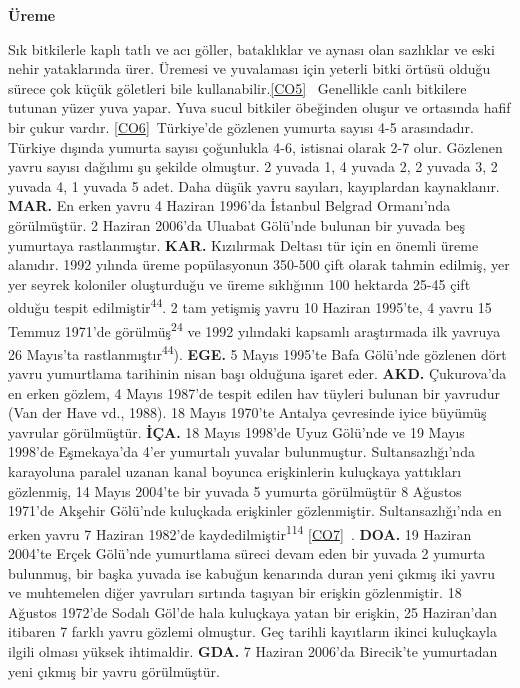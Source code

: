 \documentclass[
  letterpaper,
  DIV=11,
  numbers=noendperiod]{scrreprt}
\begin{document}
\textbf{Üreme}

Sık bitkilerle kaplı tatlı ve acı göller, bataklıklar ve aynası olan
sazlıklar ve eski nehir yataklarında ürer. Üremesi ve yuvalaması için
yeterli bitki örtüsü olduğu sürece çok küçük göletleri bile
kullanabilir.\hyperref[_msocom_5]{{[}CO5{]}}~ Genellikle canlı bitkilere
tutunan yüzer yuva yapar. Yuva sucul bitkiler öbeğinden oluşur ve
ortasında hafif bir çukur vardır.
\hyperref[_msocom_6]{{[}CO6{]}}~Türkiye'de gözlenen yumurta sayısı 4-5
arasındadır. Türkiye dışında yumurta sayısı çoğunlukla 4-6, istisnai
olarak 2-7 olur. Gözlenen yavru sayısı dağılımı şu şekilde olmuştur. 2
yuvada 1, 4 yuvada 2, 2 yuvada 3, 2 yuvada 4, 1 yuvada 5 adet. Daha
düşük yavru sayıları, kayıplardan kaynaklanır. \textbf{MAR.} En erken
yavru 4 Haziran 1996'da İstanbul Belgrad Ormanı'nda görülmüştür. 2
Haziran 2006'da Uluabat Gölü'nde bulunan bir yuvada beş yumurtaya
rastlanmıştır. \textbf{KAR.} Kızılırmak Deltası tür için en önemli üreme
alanıdır. 1992 yılında üreme popülasyonun 350-500 çift olarak tahmin
edilmiş, yer yer seyrek koloniler oluşturduğu ve üreme sıklığının 100
hektarda 25-45 çift olduğu tespit edilmiştir\textsuperscript{44}. 2 tam
yetişmiş yavru 10 Haziran 1995'te, 4 yavru 15 Temmuz 1971'de
görülmüş\textsuperscript{24} ve 1992 yılındaki kapsamlı araştırmada ilk
yavruya 26 Mayıs'ta rastlanmıştır\textsuperscript{44}). \textbf{EGE.} 5
Mayıs 1995'te Bafa Gölü'nde gözlenen dört yavru yumurtlama tarihinin
nisan başı olduğuna işaret eder. \textbf{AKD.} Çukurova'da en erken
gözlem, 4 Mayıs 1987'de tespit edilen hav tüyleri bulunan bir yavrudur
(Van der Have vd., 1988). 18 Mayıs 1970'te Antalya çevresinde iyice
büyümüş yavrular görülmüştür. \textbf{İÇA.} 18 Mayıs 1998'de Uyuz
Gölü'nde ve 19 Mayıs 1998'de Eşmekaya'da 4'er yumurtalı yuvalar
bulunmuştur. Sultansazlığı'nda karayoluna paralel uzanan kanal boyunca
erişkinlerin kuluçkaya yattıkları gözlenmiş, 14 Mayıs 2004'te bir yuvada
5 yumurta görülmüştür 8 Ağustos 1971'de Akşehir Gölü'nde kuluçkada
erişkinler gözlenmiştir. Sultansazlığı'nda en erken yavru 7 Haziran
1982'de kaydedilmiştir\textsuperscript{114}
\hyperref[_msocom_7]{{[}CO7{]}}~. \textbf{DOA.} 19 Haziran 2004'te Erçek
Gölü'nde yumurtlama süreci devam eden bir yuvada 2 yumurta bulunmuş, bir
başka yuvada ise kabuğun kenarında duran yeni çıkmış iki yavru ve
muhtemelen diğer yavruları sırtında taşıyan bir erişkin gözlenmiştir. 18
Ağustos 1972'de Sodalı Göl'de hala kuluçkaya yatan bir erişkin, 25
Haziran'dan itibaren 7 farklı yavru gözlemi olmuştur. Geç tarihli
kayıtların ikinci kuluçkayla ilgili olması yüksek ihtimaldir.
\textbf{GDA.} 7 Haziran 2006'da Birecik'te yumurtadan yeni çıkmış bir
yavru görülmüştür.
\end{document}
